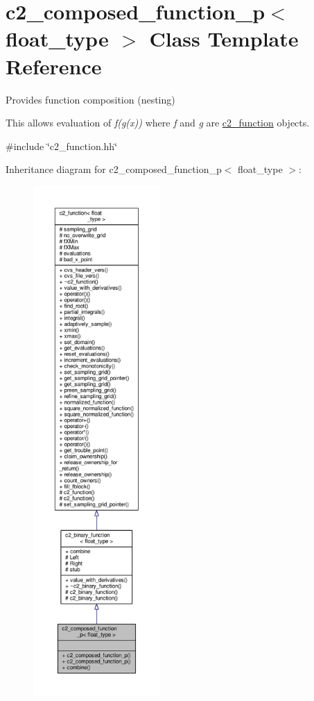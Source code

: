 \hypertarget{classc2__composed__function__p}{}\section{c2\+\_\+composed\+\_\+function\+\_\+p$<$ float\+\_\+type $>$ Class Template Reference}
\label{classc2__composed__function__p}


Provides function composition (nesting)

This allows evaluation of {\itshape f(g(x))} where {\itshape f} and {\itshape g} are \hyperlink{classc2__function}{c2\+\_\+function} objects.  




{\ttfamily \#include \char`\"{}c2\+\_\+function.\+hh\char`\"{}}



Inheritance diagram for c2\+\_\+composed\+\_\+function\+\_\+p$<$ float\+\_\+type $>$\+:
\nopagebreak
\begin{figure}[H]
\begin{center}
\leavevmode
\includegraphics[height=550pt]{classc2__composed__function__p__inherit__graph}
\end{center}
\end{figure}


